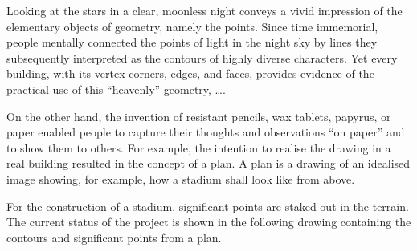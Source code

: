 \begin{MIntro}


Looking at the stars in a clear, moonless night conveys a vivid impression of the 
elementary objects of geometry, namely the points. Since time immemorial, people mentally 
connected the points of light in the night sky by lines they subsequently interpreted 
as the contours of highly diverse characters. Yet every building, with its vertex corners, 
edges, and faces, provides evidence of the practical use of this ``heavenly'' geometry, \ldots.

On the other hand, the invention of resistant pencils, wax tablets, papyrus, or paper enabled
people to capture their thoughts and observations ``on paper'' and to show them to
others. For example, the intention to realise the drawing in a real building resulted in the 
concept of a plan. A plan is a drawing of an idealised image showing, for example, how 
a stadium shall look like from above.

For the construction of a stadium, significant points are staked out in the terrain. The 
current status of the project is shown in the following drawing containing the contours and 
significant points from a plan. 



\end{MIntro}
